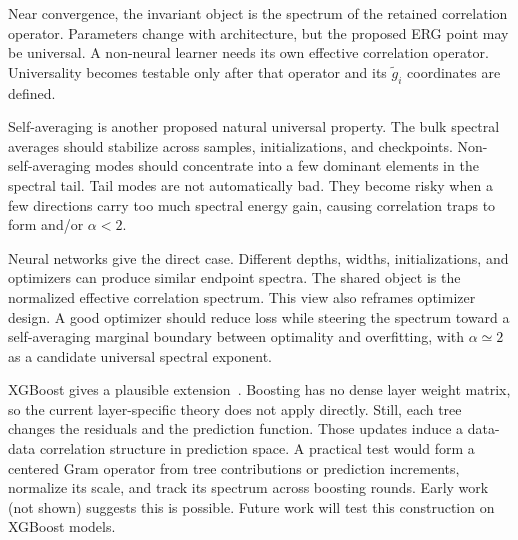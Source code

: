 \documentclass[10pt,twocolumn]{article}
\begin{document}
Near convergence, the invariant object is the spectrum of the retained correlation operator.
Parameters change with architecture, but the proposed ERG point may be universal. A non-neural learner needs its own effective correlation operator. Universality becomes testable only after that operator and its $\widetilde g_i$ coordinates are defined.

Self-averaging is another proposed natural universal property. The bulk spectral averages should stabilize across samples, initializations, and checkpoints.  Non-self-averaging modes should concentrate into a few dominant elements in the spectral tail.
Tail modes are not automatically bad. They become risky when a few directions carry too much spectral energy gain,
causing correlation traps to form and/or $\alpha < 2$.

Neural networks give the direct case. Different depths, widths, initializations, and optimizers can produce similar endpoint spectra. The shared object is the normalized effective correlation spectrum. This view also reframes optimizer design. A good optimizer should reduce loss while steering the spectrum toward a self-averaging marginal boundary between
optimality and overfitting, with $\alpha\simeq 2$ as a candidate universal spectral exponent.

XGBoost gives a plausible extension~\cite{ChenGuestrin2016}. Boosting has no dense layer weight matrix, so the current layer-specific theory does not apply directly. Still, each tree changes the residuals and the prediction function. Those updates induce a data-data correlation structure in prediction space. A practical test would form a centered Gram operator from tree contributions or prediction increments, normalize its scale, and track its spectrum across boosting rounds.
Early work (not shown) suggests this is possible. Future work will test this construction on XGBoost models.
\end{document}
